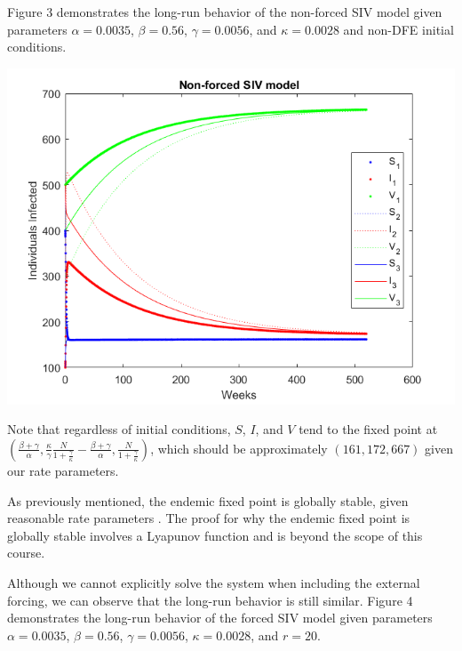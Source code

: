 \documentclass[12pt]{article}
\newenvironment{Figure}
  {\par\medskip\noindent\minipage{\linewidth}}
  {\endminipage\par\medskip}
\begin{document}
Figure 3 demonstrates the long-run behavior of the non-forced SIV model given parameters $\alpha = 0.0035$, $\beta = 0.56$, $\gamma = 0.0056$, and $\kappa = 0.0028$ and non-DFE initial conditions.

\begin{Figure}
    \centering
    \includegraphics[width = \linewidth]{example_nonForced_siv_end.png}
\end{Figure}

Note that regardless of initial conditions, $S$, $I$, and $V$ tend to the fixed point at $(\frac{\beta + \gamma}{\alpha}, \frac{\kappa}{\gamma}\frac{N}{1 + \frac{\gamma}{\kappa}} - \frac{\beta + \gamma}{\alpha}, \frac{N}{1 + \frac{\gamma}{\kappa}})$, which should be approximately $(161, 172, 667)$ given our rate parameters.

As previously mentioned, the endemic fixed point is globally stable, given reasonable rate parameters \citep{sun2010global}. The proof for why the endemic fixed point is globally stable involves a Lyapunov function and is beyond the scope of this course.

Although we cannot explicitly solve the system when including the external forcing, we can observe that the long-run behavior is still similar. Figure 4 demonstrates the long-run behavior of the forced SIV model given parameters $\alpha = 0.0035$, $\beta = 0.56$, $\gamma = 0.0056$, $\kappa = 0.0028$, and $r = 20$.
\end{document}
